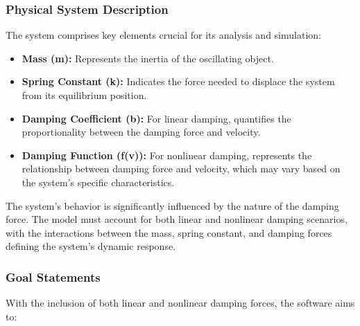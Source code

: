 \documentclass[12pt]{article}
\begin{document}
\subsubsection{Physical System Description} \label{sec_phySystDescrip}

The system comprises key elements crucial for its analysis and simulation:
\begin{itemize}
  \item \textbf{Mass (m):} Represents the inertia of the oscillating object.
  \item \textbf{Spring Constant (k):} Indicates the force needed to displace the 
  system from its equilibrium position.
  \item \textbf{Damping Coefficient (b):} For linear damping, quantifies the 
  proportionality between the damping force and velocity.
  \item \textbf{Damping Function (f(v)):} For nonlinear damping, represents the 
  relationship between damping force and velocity, which may vary based on the 
  system's specific characteristics.
\end{itemize}
 
 
The system's behavior is significantly influenced by the nature of the damping 
force. The model must account for both linear and nonlinear damping scenarios, 
with the interactions between the mass, spring constant, and damping forces 
defining the system's dynamic response.



\subsubsection{Goal Statements}

With the inclusion of both linear and nonlinear damping forces, the software aims 
to:
\end{document}
